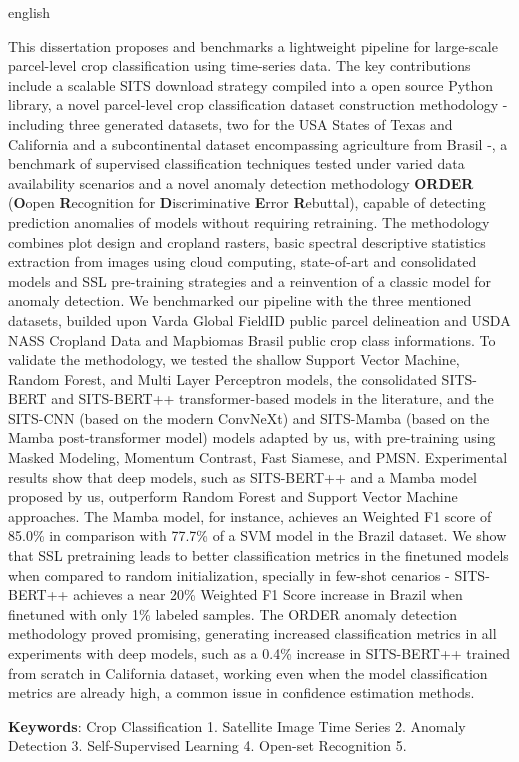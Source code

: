 \begin{resumo}[Abstract]
 \begin{otherlanguage*}{english}


\vspace{\onelineskip}

{}
{
This dissertation proposes and benchmarks a lightweight pipeline for large-scale parcel-level crop classification using time-series data. The key contributions include a scalable SITS download strategy compiled into a open source Python library, a novel parcel-level crop classification dataset construction methodology - including three generated datasets, two for the USA States of Texas and California and a subcontinental dataset encompassing agriculture from Brasil -, a benchmark of supervised classification techniques tested under varied data availability scenarios and a novel anomaly detection methodology \textbf{ORDER} (\textbf{O}open \textbf{R}ecognition for \textbf{D}iscriminative \textbf{E}rror \textbf{R}ebuttal), capable of detecting prediction anomalies of models without requiring retraining. The methodology combines plot design and cropland rasters, basic spectral descriptive statistics extraction from images using cloud computing, state-of-art and consolidated models and SSL pre-training strategies and a reinvention of a classic model for anomaly detection. We benchmarked our pipeline with the three mentioned datasets, builded upon Varda Global FieldID public parcel delineation and USDA NASS Cropland Data and Mapbiomas Brasil public crop class informations. To validate the methodology, we tested the shallow Support Vector Machine, Random Forest, and Multi Layer Perceptron models, the consolidated SITS-BERT and SITS-BERT++ transformer-based models in the literature, and the SITS-CNN (based on the modern ConvNeXt) and SITS-Mamba (based on the Mamba post-transformer model) models adapted by us, with pre-training using Masked Modeling, Momentum Contrast, Fast Siamese, and PMSN. Experimental results show that deep models, such as SITS-BERT++ and a Mamba model proposed by us, outperform Random Forest and Support Vector Machine approaches. The Mamba model, for instance, achieves an Weighted F1 score of 85.0\% in comparison with 77.7\% of a SVM model in the Brazil dataset. We show that SSL pretraining leads to better classification metrics in the finetuned models when compared to random initialization, specially in few-shot cenarios - SITS-BERT++ achieves a near 20\% Weighted F1 Score increase in Brazil when finetuned with only 1\% labeled samples. The ORDER anomaly detection methodology proved promising, generating increased classification metrics in all experiments with deep models, such as a 0.4\% increase in SITS-BERT++ trained from scratch in California dataset, working even when the model classification metrics are already high, a common issue in confidence estimation methods.
}

   \vspace{\onelineskip}

   \noindent
   \textbf{Keywords}: Crop Classification 1. Satellite Image Time Series 2. Anomaly Detection 3. Self-Supervised Learning 4. Open-set Recognition 5.
 \end{otherlanguage*}
\end{resumo}